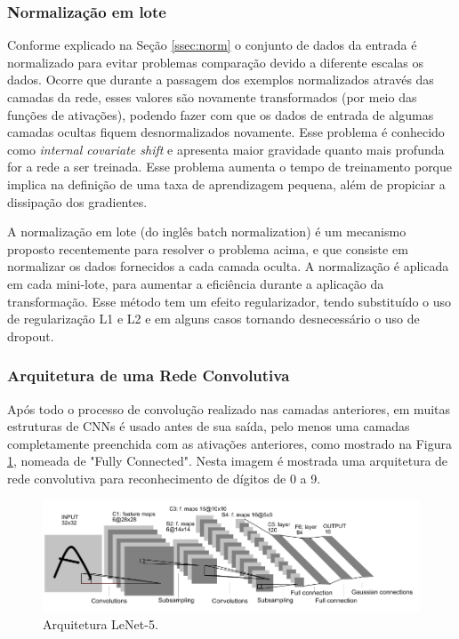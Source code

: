 \subsubsection{Normalização em lote}

Conforme explicado na Seção \ref{ssec:norm} o conjunto de dados da entrada é normalizado para evitar problemas comparação devido a diferente escalas os dados. Ocorre que durante a passagem dos exemplos normalizados através das camadas da rede, esses valores são novamente transformados (por meio das funções de ativações), podendo fazer com que os dados de entrada de algumas camadas ocultas fiquem desnormalizados novamente. Esse problema é conhecido como \textit{internal covariate shift} e apresenta maior gravidade quanto mais profunda for a rede a ser treinada. Esse problema aumenta o tempo de treinamento porque implica na definição de uma taxa de aprendizagem pequena, além de propiciar a dissipação dos gradientes.

A normalização em lote (do inglês batch normalization) é um mecanismo proposto recentemente para resolver o problema acima, e que consiste em normalizar os dados fornecidos a cada camada oculta. A normalização é aplicada em cada mini-lote, para
aumentar a eficiência durante a aplicação da transformação. Esse método tem um efeito regularizador, tendo substituído o uso de regularização L1 e L2 e em alguns casos tornando desnecessário o uso de dropout.

\subsubsection{Arquitetura de uma Rede Convolutiva}

Após todo o processo de convolução realizado nas camadas anteriores, em muitas estruturas de CNNs é usado antes de sua saída, pelo menos uma camadas completamente preenchida com as ativações anteriores, como mostrado na Figura \ref{fig-alexnet}, nomeada de "Fully Connected". Nesta imagem é mostrada uma arquitetura de rede convolutiva para reconhecimento de dígitos de 0 a 9.

\begin{figure}[H]
	\centering
	\includegraphics[scale=0.4]{pasta1_figuras/alexnet.png}
	\caption {Arquitetura LeNet-5. \cite{lecun98}}
	\label{fig-alexnet}
\end{figure}

